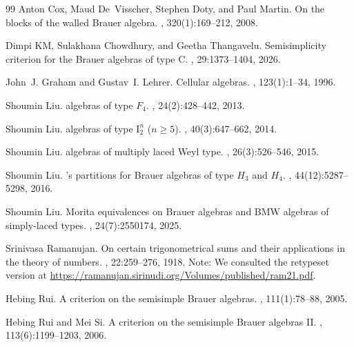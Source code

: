 \documentclass[11pt,a4paper]{amsart}
\theoremstyle{uprightdefinition}
\theoremstyle{remark}\newtheorem{remark}[theorem]{Remark}
\begin{document}
\begin{thebibliography}{99}
Anton Cox, Maud De~Visscher, Stephen Doty, and Paul Martin.
\newblock On the blocks of the walled {Brauer} algebra.
, 320(1):169--212, 2008.

{Dimpi KM}, Sulakhana Chowdhury, and Geetha Thangavelu.
\newblock Semisimplicity criterion for the {Brauer} algebras of type {C}.
, 29:1373--1404, 2026.

John~J. Graham and Gustav~I. Lehrer.
\newblock Cellular algebras.
, 123(1):1--34, 1996.

Shoumin Liu.
 algebras of type {$F_4$}.
, 24(2):428--442, 2013.

Shoumin Liu.
 algebras of type {$\mathrm{I}_2^n$} ({$n\geq 5$}).
, 40(3):647--662, 2014.


Shoumin Liu.
 algebras of multiply laced {Weyl} type.
, 26(3):526--546, 2015.

Shoumin Liu.
's partitions for {Brauer} algebras of type {$H_3$} and
  {$H_4$}.
, 44(12):5287--5298, 2016.

Shoumin Liu.
\newblock Morita equivalences on {Brauer} algebras and {BMW} algebras of
  simply-laced types.
, 24(7):2550174, 2025.

Srinivasa Ramanujan.
\newblock On certain trigonometrical sums and their applications in the
  theory of numbers.
,
  22:259--276, 1918.
\newblock Note: We consulted the retypeset version at
  \url{https://ramanujan.sirinudi.org/Volumes/published/ram21.pdf}.

Hebing Rui.
\newblock A criterion on the semisimple {Brauer} algebras.
, 111(1):78--88, 2005.

Hebing Rui and Mei Si.
\newblock A criterion on the semisimple {Brauer} algebras {II}.
, 113(6):1199--1203,
  2006.

\end{thebibliography}
\endgroup
\end{document}
